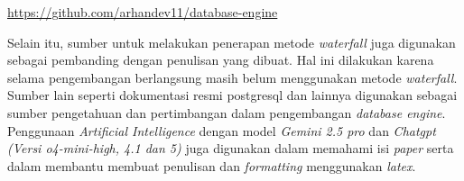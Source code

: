 \begin{center}
	\href{https://github.com/arhandev11/database-engine}{https://github.com/arhandev11/database-engine}
\end{center}

Selain itu, sumber untuk melakukan penerapan metode \emph{waterfall} juga digunakan sebagai pembanding dengan penulisan yang dibuat. Hal ini dilakukan karena selama 
pengembangan berlangsung masih belum menggunakan metode \emph{waterfall}. Sumber lain seperti dokumentasi resmi postgresql dan lainnya digunakan sebagai
sumber pengetahuan dan pertimbangan dalam pengembangan \emph{database engine}. Penggunaan \emph{Artificial Intelligence} dengan model \emph{Gemini 2.5 pro} dan \emph{Chatgpt (Versi o4-mini-high, 4.1 dan 5)} juga
digunakan dalam memahami isi \emph{paper} serta dalam membantu membuat penulisan dan \emph{formatting} menggunakan \emph{latex}.


